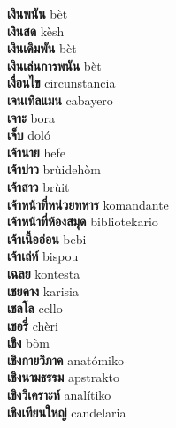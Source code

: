 \textbf{ เงินพนัน  } bèt \\
\textbf{ เงินสด  } kèsh \\
\textbf{ เงินเดิมพัน  } bèt \\
\textbf{ เงินเล่นการพนัน  } bèt \\
\textbf{ เงื่อนไข  } circunstancia \\
\textbf{ เจนเทิลแมน  } cabayero \\
\textbf{ เจาะ  } bora \\
\textbf{ เจ็บ  } doló \\
\textbf{ เจ้านาย  } hefe \\
\textbf{ เจ้าบ่าว  } brùidehòm \\
\textbf{ เจ้าสาว  } brùit \\
\textbf{ เจ้าหน้าที่หน่วยทหาร  } komandante \\
\textbf{ เจ้าหน้าที่ห้องสมุด  } bibliotekario \\
\textbf{ เจ้าเนื้ออ่อน  } bebi \\
\textbf{ เจ้าเล่ห์  } bispou \\
\textbf{ เฉลย  } kontesta \\
\textbf{ เชยคาง  } karisia \\
\textbf{ เชลโล  } cello \\
\textbf{ เชอรี่  } chèri \\
\textbf{ เชิง  } bòm \\
\textbf{ เชิงกายวิภาค  } anatómiko \\
\textbf{ เชิงนามธรรม  } apstrakto \\
\textbf{ เชิงวิเคราะห์  } analítiko \\
\textbf{ เชิงเทียนใหญ่  } candelaria \\

